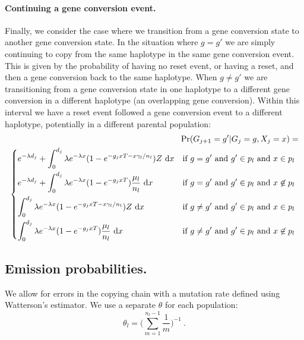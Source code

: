 \paragraph{Continuing a gene conversion event.}
Finally, we consider the case where we transition from a gene conversion state to another gene conversion state.
In the situation where $g=g'$ we are simply continuing to copy from the same haplotype in the same gene conversion event.
This is given by the probability of having no reset event, or having a reset, and then a gene conversion back to the same haplotype.
When $g \ne g'$ we are transitioning from a gene conversion state in one haplotype to a different gene conversion in a different haplotype (an overlapping gene conversion).
Within this interval we have a reset event followed a gene conversion event to a different haplotype, potentially in a different parental population:
%
\begin{equation} \begin{split}
\Pr(G_{j+1}=g'|G_{j}=g,X_j=x) = \\
\begin{dcases}
    e^{-\lambda d_{j}} + 
    \int_0^{d_j} \lambda e^{-\lambda x} (1-e^{-g_j x T -x\gamma_l/n_l}) Z ~\mathrm{d}x
    &  \text{if $g = g'$ and $g' \in p_l $ and $x \in p_l$ } \\%
    e^{-\lambda d_{j}} + 
    \int_0^{d_j} \lambda e^{-\lambda x} (1-e^{-g_j x T }) \frac{\mu_l}{n_l} ~\mathrm{d}x
    &  \text{if $g = g'$ and $g' \in p_l $ and $x \not\in p_l$ } \\%
    \int_0^{d_j} \lambda e^{-\lambda x} (1-e^{-g_j x T -x\gamma_l/n_l}) Z ~\mathrm{d}x
    &  \text{if $g \ne g'$ and $g' \in p_l $ and $x \in p_l$ } \\%
    \int_0^{d_j} \lambda e^{-\lambda x} (1-e^{-g_j x T }) \frac{\mu_l}{n_l} ~\mathrm{d}x
    &  \text{if $g \ne g'$ and $g' \in p_l $ and $x \not\in p_l$ } \\%
\end{dcases}
\end{split}
\end{equation}


\subsection{Emission probabilities.}
We allow for errors in the copying chain with a mutation rate defined using Watterson's estimator\cite{Watterson1975,Li2003}.
We use a separate $\theta$ for each population:
%
\begin{equation}
    \theta_l = \Bigg( \sum\limits_{m=1}^{n_l-1} \frac{1}{m} \Bigg) ^{-1} ~.
\end{equation}

